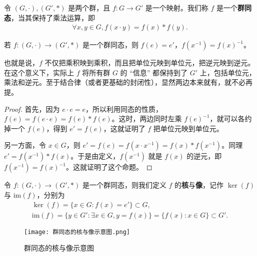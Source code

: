 \documentclass[../../main.tex]{subfiles}
\begin{document}
\begin{definition}[群同态]
令 $(G, \cdot), (G', *)$ 是两个群，且 $f : G \to G'$ 是一个映射。我们称 $f$ 是一个\textbf{群同态}，当其保持了乘法运算，即
\begin{align*}
\forall x, y \in G, f(x \cdot y) = f(x) * f(y).
\end{align*} 
\end{definition}

\begin{proposition}\label{proposition:群同态保持逆元和单位元}
若 $f : (G, \cdot) \to (G', *)$ 是一个群同态，则 $f(e) = e'$，$f(x^{-1}) = f(x)^{-1}$。
\end{proposition}
\begin{note}
也就是说，$f$ 不仅把乘积映到乘积，而且把单位元映到单位元，把逆元映到逆元。在这个意义下，实际上 $f$ 将所有群 $G$ 的 “信息” 都保持到了 $G'$ 上，包括单位元，乘法和逆元。至于结合律（或者更基础的封闭性），显然两边本来就有，就不必再提。
\end{note}
\begin{proof}
首先，因为 $e \cdot e = e$，所以利用同态的性质，$f(e) = f(e \cdot e) = f(e) * f(e)$。这时，两边同时左乘 $f(e)^{-1}$，就可以各约掉一个 $f(e)$，得到 $e' = f(e)$，这就证明了 $f$ 把单位元映到单位元。

另一方面，令 $x \in G$，则 $e' = f(e) = f(x \cdot x^{-1}) = f(x) * f(x^{-1})$。同理 $e' = f(x^{-1}) * f(x)$。于是由定义，$f(x^{-1})$ 就是 $f(x)$ 的逆元，即 $f(x^{-1}) = f(x)^{-1}$。这就证明了这个命题。 
\end{proof}

\begin{definition}[群同态的核与像]
令 $f : (G, \cdot) \to (G', *)$ 是一个群同态，则我们定义 $f$ 的\textbf{核}与\textbf{像}，记作 $\ker(f)$ 与 $\mathrm{im}(f)$，分别为
\begin{gather*}
\ker(f) = \{x \in G : f(x) = e'\} \subset G ,\\
\mathrm{im}(f) = \{y \in G' : \exists x \in G, y = f(x)\} = \{f(x) : x \in G\} \subset G'.
\end{gather*} 
\end{definition}

\begin{figure}[H]
\centering
\texttt{[image: 群同态的核与像示意图.png]}
\label{figure:群同态的核与像示意图}
\caption{群同态的核与像示意图}
\end{figure}
\end{document}
